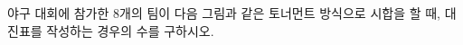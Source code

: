 야구 대회에 참가한 8개의 팀이 다음 그림과 같은 토너먼트 방식으로 시합을 할 때, 대진표를 작성하는 경우의 수를 구하시오.
\par\smallskip\begin{center}\resizebox{\ifdim\width>\linewidth\linewidth\else\width\fi}{!}{}\end{center}
